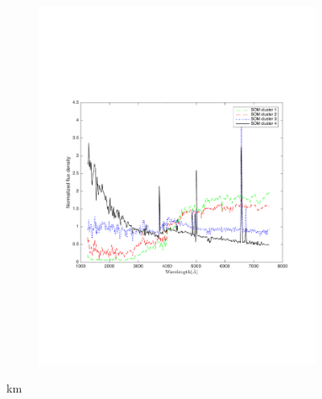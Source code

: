\begin{figure}
\begin{subfigure}[b]{0.49\textwidth}
                    \centering \includegraphics[width=.99\textwidth]{k_means_images/classified_group_in_4cluster_som.pdf}
                \end{subfigure}
                \caption{km}
                 \label{fig: som_k_means_4}
\end{figure}



